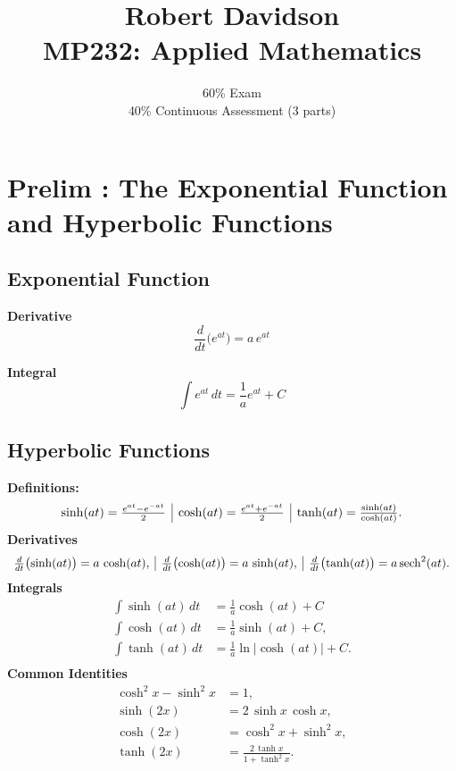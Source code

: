 \documentclass[a4paper, 10pt]{article}
\title{
Robert Davidson \\
\textbf{MP232: Applied Mathematics}
}
\author{
60\% Exam\\
40\% Continuous Assessment (3 parts)
}
\date{} %
\begin{document}
\color{gray3}
\maketitle

\tableofcontents

\pagebreak



\section{Prelim : The Exponential Function and Hyperbolic Functions}
\subsection{Exponential Function}
\noindent \begin{minipage}{0.45\textwidth}
  \textbf{Derivative}
  $$\frac{d}{dt}\bigl(e^{at}\bigr) = a\,e^{at}$$
\end{minipage}\hfill
\noindent \begin{minipage}{0.45\textwidth}
  \textbf{Integral}
  $$\int e^{at}\,dt = \frac{1}{a}e^{at} + C$$
\end{minipage}\hfill



\subsection{Hyperbolic Functions}

\textbf{Definitions:}
$$
  \begin{array}{c | c | c}
    \sinh(at) = \frac{e^{at} - e^{-at}}{2}
     &
    \cosh(at) = \frac{e^{at} + e^{-at}}{2}
     &
    \tanh(at) = \frac{\sinh(at)}{\cosh(at)}.
  \end{array}
$$
\textbf{Derivatives}
$$
  \begin{array}{c | c | c}
    \frac{d}{dt}\bigl(\sinh(at)\bigr) = a\,\cosh(at),
     &
    \frac{d}{dt}\bigl(\cosh(at)\bigr) = a\,\sinh(at),
     &
    \frac{d}{dt}\bigl(\tanh(at)\bigr) = a\,\mathrm{sech}^2(at).
  \end{array}
$$
\textbf{Integrals}
\begin{align*}
  \int \sinh(at)\,dt & = \frac{1}{a}\cosh(at) + C                 \\
  \int \cosh(at)\,dt & = \frac{1}{a}\sinh(at) + C,                \\
  \int \tanh(at)\,dt & = \frac{1}{a}\ln\bigl|\cosh(at)\bigr| + C. \\
\end{align*}
\textbf{Common Identities}
\begin{align*}
  \cosh^2 x - \sinh^2 x & = 1,                                \\
  \sinh(2x)             & = 2\,\sinh x\,\cosh x,              \\
  \cosh(2x)             & = \cosh^2 x + \sinh^2 x,            \\
  \tanh(2x)             & = \frac{2\,\tanh x}{1 + \tanh^2 x}.
\end{align*}
\end{document}
